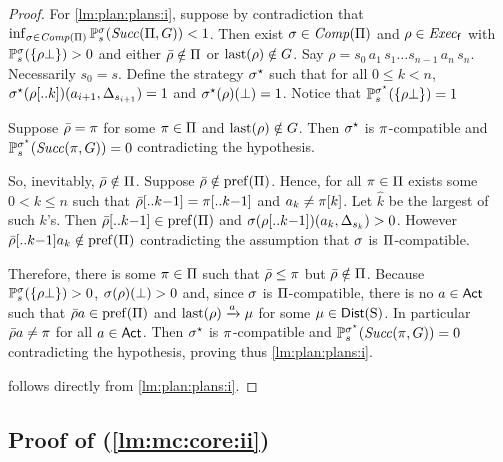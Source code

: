 \begin{proof}
  For \cref{lm:plan:plans:i}, suppose by contradiction that
  $\inf_{\sigma\in\mathit{Comp}(\Pi)}\mathbb{P}^\sigma_s(\mathit{Succ}(\Pi,G))<1$.
  Then exist $\sigma\in\mathit{Comp}(\Pi)$ and $\rho\in\mathit{Exec}_{\mathsf{f}}$ with
  $\mathbb{P}^\sigma_s(\{\rho\bot\})>0$ and either
  $\bar{\rho}\notin\Pi$ or $\mathrm{last}(\rho)\notin G$.
  Say $\rho=s_0\, a_1\, s_1\ldots s_{n-1}\, a_n\, s_n$.  Necessarily
  $s_0=s$.
  Define the strategy $\sigma^\star$ such that for all $0\leq k<n$,
  $\sigma^\star(\rho[..k])(a_{i+1},\Delta_{s_{i+1}})=1$ and
  $\sigma^\star(\rho)(\bot)=1$.  Notice that
  $\mathbb{P}^{\sigma^\star}_s(\{\rho\bot\})=1$

  Suppose $\bar{\rho}=\pi$ for some $\pi\in\Pi$ and
  $\mathrm{last}(\rho)\notin G$.  Then $\sigma^\star$ is $\pi$-compatible
  and $\mathbb{P}^{\sigma^\star}_s(\mathit{Succ}(\pi,G))=0$ contradicting the
  hypothesis.

  So, inevitably, $\bar{\rho}\notin\Pi$.
  Suppose $\bar{\rho}\notin\mathrm{pref}(\Pi)$.  Hence, for all
  $\pi\in\Pi$ exists some $0<k\leq n$ such that
  $\bar{\rho}[..k{-}1]=\pi[..k{-}1]$ and $a_k\neq\pi[k]$.  Let
  $\hat{k}$ be the largest of such $k$'s.
  Then $\bar{\rho}[..k{-}1]\in\mathrm{pref}(\Pi)$ and
  $\sigma(\rho[..k{-}1])(a_k,\Delta_{s_k})>0$.  However
  $\bar{\rho}[..k{-}1]a_k\notin\mathrm{pref}(\Pi)$ contradicting the
  assumption that $\sigma$ is $\Pi$-compatible.

  Therefore, there is some $\pi\in\Pi$ such that
  $\bar{\rho}\leq\pi$ but $\bar{\rho}\notin\Pi$.
  Because $\mathbb{P}^\sigma_s(\{\rho\bot\})>0$,
  $\sigma(\rho)(\bot)>0$ and, since $\sigma$ is
  $\Pi$-compatible, there is no $a\in{\rm \sf Act}$ such that
  $\bar{\rho}a\in\mathrm{pref}(\Pi)$ and $\mathrm{last}(\rho)\xrightarrow{a}\mu$ for some
  $\mu\in\mathsf{Dist}(\operatorname{S})$.
  In particular $\bar{\rho}a\neq\pi$ for all $a\in{\rm \sf Act}$.  Then
  $\sigma^\star$ is $\pi$-compatible and
  $\mathbb{P}^{\sigma^\star}_s(\mathit{Succ}(\pi,G))=0$ contradicting the
  hypothesis, proving thus \cref{lm:plan:plans:i}.

   follows directly from \cref{lm:plan:plans:i}.
\end{proof}




\subsection{Proof of  (\cref{lm:mc:core:ii})}

